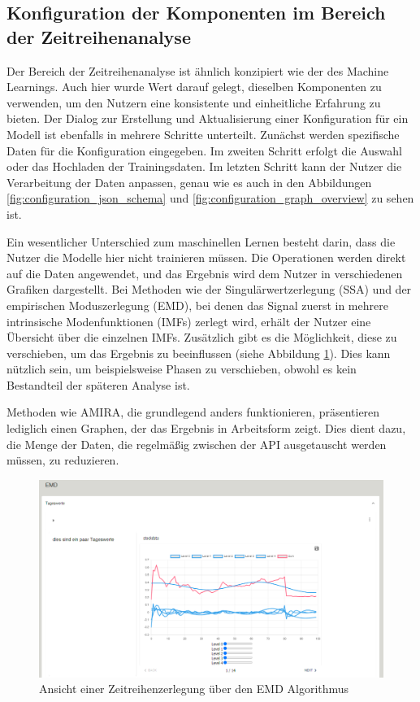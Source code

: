\subsection{Konfiguration der Komponenten im Bereich der Zeitreihenanalyse}
\label{sec:reactTSA}
Der Bereich der Zeitreihenanalyse ist ähnlich konzipiert wie der des Machine Learnings. Auch hier wurde Wert darauf gelegt, dieselben Komponenten zu verwenden, um den Nutzern eine konsistente und einheitliche Erfahrung zu bieten. 
Der Dialog zur Erstellung und Aktualisierung einer Konfiguration für ein Modell ist ebenfalls in mehrere Schritte unterteilt. Zunächst werden spezifische Daten für die Konfiguration eingegeben. Im zweiten Schritt erfolgt die Auswahl oder das Hochladen der Trainingsdaten. 
Im letzten Schritt kann der Nutzer die Verarbeitung der Daten anpassen, genau wie es auch in den Abbildungen \ref{fig:configuration_json_schema} und \ref{fig:configuration_graph_overview} zu sehen ist.

Ein wesentlicher Unterschied zum maschinellen Lernen besteht darin, dass die Nutzer die Modelle hier nicht trainieren müssen. Die Operationen werden direkt auf die Daten angewendet, und das Ergebnis wird dem Nutzer in verschiedenen Grafiken dargestellt. 
Bei Methoden wie der Singulärwertzerlegung (\ac{SSA}) und der empirischen Moduszerlegung (\ac{EMD}), bei denen das Signal zuerst in mehrere intrinsische Modenfunktionen (\acp{IMF}) zerlegt wird, erhält der Nutzer eine Übersicht über die einzelnen \acp{IMF}. 
Zusätzlich gibt es die Möglichkeit, diese zu verschieben, um das Ergebnis zu beeinflussen (siehe Abbildung \ref{fig:tsa_trained_configuration}). Dies kann nützlich sein, um beispielsweise Phasen zu verschieben, obwohl es kein Bestandteil der späteren Analyse ist.

Methoden wie AMIRA, die grundlegend anders funktionieren, präsentieren lediglich einen Graphen, der das Ergebnis in Arbeitsform zeigt. Dies dient dazu, die Menge der Daten, die regelmäßig zwischen der API ausgetauscht werden müssen, zu reduzieren.
\begin{figure}[h]
    \centering
    \includegraphics[width=0.9\linewidth]{includes/figures/new_version/tsa_configuration.png}
    \caption{Ansicht einer Zeitreihenzerlegung über den \ac{EMD} Algorithmus}
\label{fig:tsa_trained_configuration}
\end{figure}

